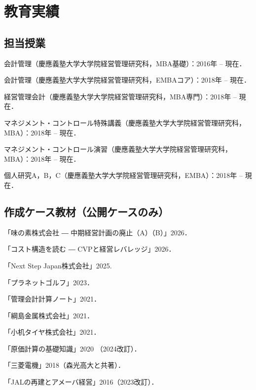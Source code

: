 \documentclass[letterpaper,11pt]{article}
\renewenvironment{itemize}{
  \begin{list}{}{
    \setlength{\leftmargin}{1.5em}
  }
}{
  \end{list}
}
\begin{document}
\section*{教育実績}

\subsection*{担当授業}

\begin{itemize}
    \item 会計管理（慶應義塾大学大学院経営管理研究科，MBA基礎）：2016年 -- 現在．
    \item 会計管理（慶應義塾大学大学院経営管理研究科，EMBAコア）：2018年 -- 現在．
    \item 経営管理会計（慶應義塾大学大学院経営管理研究科，MBA専門）：2018年 -- 現在．
    \item マネジメント・コントロール特殊講義（慶應義塾大学大学院経営管理研究科，MBA）：2018年 -- 現在．
    \item マネジメント・コントロール演習（慶應義塾大学大学院経営管理研究科，MBA）：2018年 -- 現在．
    \item 個人研究A，B，C（慶應義塾大学大学院経営管理研究科，EMBA）：2018年 -- 現在．
\end{itemize}

\subsection*{作成ケース教材（公開ケースのみ）}

\begin{itemize}
    \item 「味の素株式会社 ― 中期経営計画の廃止（A）（B）」2026．
    \item 「コスト構造を読む ― CVPと経営レバレッジ」2026．
    \item 「Next Step Japan株式会社」2025.
    \item 「プラネットゴルフ」2023．
    \item 「管理会計計算ノート」2021．
    \item 「綱島金属株式会社」2021．
    \item 「小机タイヤ株式会社」2021．
   \item 「原価計算の基礎知識」2020 （2024改訂）．
   \item 「三菱電機」2018（森光高大と共著）．
   \item 「JALの再建とアメーバ経営」2016（2023改訂）．
\end{itemize}
\end{document}
